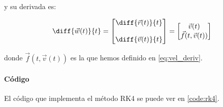 y su derivada es:

\begin{equation*}
	\diff{\vec{w}(t)}{t} =
\begin{bmatrix}
	\diff{\vec{r}(t)}{t} \\ \\
	\diff{\vec{v}(t)}{t}
\end{bmatrix} =
\begin{bmatrix}
	\vec{v}(t) \\
	\vec{f}(t, \vec{v}(t))
\end{bmatrix}
\end{equation*}

donde $\vec{f}(t, \vec{v}(t))$ es la que hemos definido en \eqref{eq:vel_deriv}.


\paragraph{Código} El código que implementa el método RK4 se puede ver en \ref{code:rk4}.